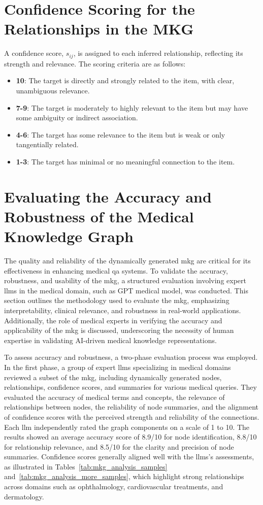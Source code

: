 \section{Confidence Scoring for the Relationships in the MKG}
\label{app:confidence}
A confidence score, $s_{ij}$, is assigned to each inferred relationship, reflecting its strength and relevance. The scoring criteria are as follows:
\begin{itemize}
    \item \textbf{10}: The target is directly and strongly related to the item, with clear, unambiguous relevance.
    \item \textbf{7-9}: The target is moderately to highly relevant to the item but may have some ambiguity or indirect association.
    \item \textbf{4-6}: The target has some relevance to the item but is weak or only tangentially related.
    \item \textbf{1-3}: The target has minimal or no meaningful connection to the item.
\end{itemize}


\section{Evaluating the Accuracy and Robustness of the Medical Knowledge Graph}
\label{app:mkd-analysis}

The quality and reliability of the dynamically generated \gls{mkg} are critical for its effectiveness in enhancing medical \gls{qa} systems. To validate the accuracy, robustness, and usability of the \gls{mkg}, a structured evaluation involving expert \glspl{llm} in the medical domain, such as GPT medical model, was conducted. This section outlines the methodology used to evaluate the \gls{mkg}, emphasizing interpretability, clinical relevance, and robustness in real-world applications. Additionally, the role of medical experts in verifying the accuracy and applicability of the \gls{mkg} is discussed, underscoring the necessity of human expertise in validating AI-driven medical knowledge representations.

To assess accuracy and robustness, a two-phase evaluation process was employed. In the first phase, a group of expert \glspl{llm} specializing in medical domains reviewed a subset of the \gls{mkg}, including dynamically generated nodes, relationships, confidence scores, and summaries for various medical queries. They evaluated the accuracy of medical terms and concepts, the relevance of relationships between nodes, the reliability of node summaries, and the alignment of confidence scores with the perceived strength and reliability of the connections. Each \gls{llm} independently rated the graph components on a scale of 1 to 10. The results showed an average accuracy score of 8.9/10 for node identification, 8.8/10 for relationship relevance, and 8.5/10 for the clarity and precision of node summaries. Confidence scores generally aligned well with the \glspl{llm}'s assessments, as illustrated in Tables~\ref{tab:mkg_analysis_samples} and~\ref{tab:mkg_analysis_more_samples}, which highlight strong relationships across domains such as ophthalmology, cardiovascular treatments, and dermatology.

